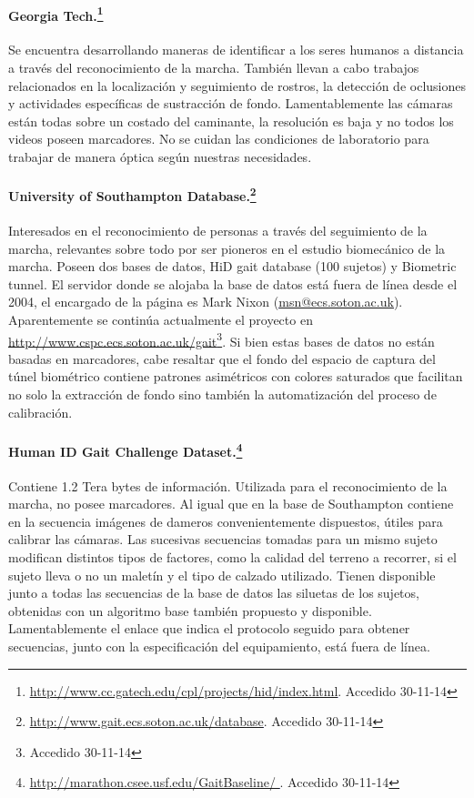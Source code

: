 \paragraph{Georgia Tech.\footnote{\textcolor{blue}{\underline{\url{http://www.cc.gatech.edu/cpl/projects/hid/index.html}}}. Accedido 30-11-14}}
Se encuentra desarrollando maneras de identificar a los seres humanos a distancia a través del reconocimiento de la marcha. También llevan a cabo trabajos relacionados en la localización y seguimiento de rostros, la detección de oclusiones y actividades específicas de sustracción de fondo.
Lamentablemente las cámaras están todas sobre un costado del caminante, la resolución es baja y no todos los videos poseen marcadores. No se cuidan las condiciones de laboratorio para trabajar de manera óptica según nuestras necesidades.


\paragraph{University of Southampton Database.\footnote{ \textcolor{blue}{\underline{\url{http://www.gait.ecs.soton.ac.uk/database}}}. Accedido 30-11-14}}\label{U.S.}
Interesados en el reconocimiento de personas a través del seguimiento de la marcha, relevantes sobre todo por ser pioneros en el estudio biomecánico de la marcha. Poseen dos bases de datos, HiD gait database  (100 sujetos) y Biometric tunnel. El servidor donde se alojaba la base de datos está fuera de línea desde el 2004, el encargado de la página es Mark Nixon (\textcolor{blue}{\underline{\url{msn@ecs.soton.ac.uk}}}). Aparentemente se continúa actualmente el proyecto en \textcolor{blue}{\underline{\url{http://www.cspc.ecs.soton.ac.uk/gait}}}\footnote{Accedido 30-11-14}. Si bien estas bases de datos no están basadas en marcadores, cabe resaltar que el fondo del espacio de captura del túnel biométrico contiene patrones asimétricos con colores saturados que facilitan no solo la extracción de fondo sino también la automatización del proceso de calibración.

\paragraph{Human ID Gait Challenge Dataset.\footnote{\textcolor{blue}{\underline{\url{http://marathon.csee.usf.edu/GaitBaseline/ }}}. Accedido 30-11-14} }
Contiene 1.2 Tera bytes de información. Utilizada para el reconocimiento de la marcha,  no posee marcadores. Al igual que en la base de Southampton contiene en la secuencia imágenes de dameros convenientemente dispuestos, útiles para calibrar las cámaras. Las sucesivas secuencias tomadas para un mismo sujeto modifican distintos tipos de factores, como la calidad del terreno a recorrer, si el sujeto lleva o no un maletín y el  tipo de calzado utilizado. Tienen disponible junto a todas las secuencias de la base de datos las siluetas de los sujetos, obtenidas con un algoritmo base también propuesto y disponible. Lamentablemente el enlace que indica el protocolo seguido para obtener secuencias, junto con la especificación del equipamiento, está fuera de línea.

